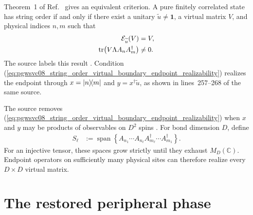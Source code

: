\documentclass[11pt]{article}
\begin{document}
Theorem~1 of Ref.~\cite{PerezGarcia2008StringOrder} gives an equivalent
criterion. A pure finitely correlated state has string order if and only if
there exist a unitary $\widetilde{u}\neq\mathbf{1}$, a virtual matrix $V$, and
physical indices $n,m$ such that
\begin{align}
    \mathcal{E}_{\widetilde{u}}(V)
     & =V,
    \label{eq:pgwsvc08_string_order_virtual_boundary_source_fixed_point} \\
    \operatorname{tr}\!\left(V\Lambda A_nA_m^\dagger\right)
     & \neq0.
    \label{eq:pgwsvc08_string_order_virtual_boundary_endpoint_realizability}
\end{align}
The source labels this result 
\cite[lines~270--276]{PerezGarcia2008StringOrder}. Condition
(\ref{eq:pgwsvc08_string_order_virtual_boundary_endpoint_realizability})
realizes the endpoint through $x=|n\rangle\!\langle m|$ and
$y=x^\dagger\widetilde{u}$, as shown in lines~257--268 of the same source.

The source removes
(\ref{eq:pgwsvc08_string_order_virtual_boundary_endpoint_realizability}) when
$x$ and $y$ may be products of observables on $D^2$ spins
\cite[lines~278--296]{PerezGarcia2008StringOrder}. For bond dimension $D$,
define
\begin{align}
    S_\ell
     & :=
    \operatorname{span}
    \left\{A_{n_1}\cdots A_{n_\ell}
    A_{m_\ell}^\dagger\cdots A_{m_1}^\dagger\right\}.
    \label{eq:pgwsvc08_string_order_virtual_boundary_endpoint_span}
\end{align}
For an injective tensor, these spaces grow strictly until they exhaust
$M_D(\mathbb{C})$. Endpoint operators on sufficiently many physical sites can
therefore realize every $D\times D$ virtual matrix.

\section{The restored peripheral phase}
\end{document}
